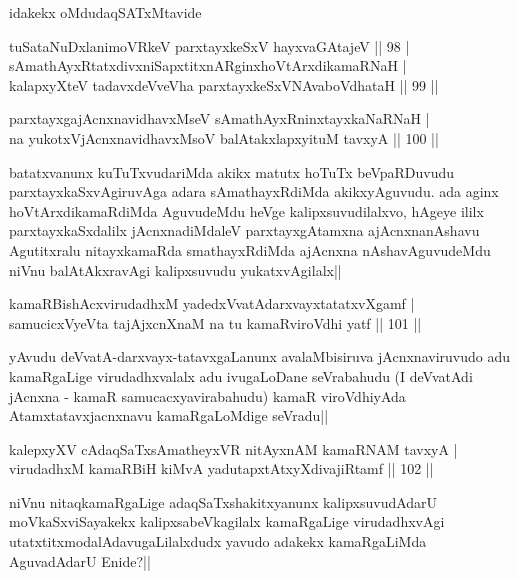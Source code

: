 \begin{artha}
idakekx oMdudaqSATxMtavide
\end{artha}

\begin{shl}
tuSataNuDxlanimoVRkeV parxtayxkeSxV hayxvaGAtajeV \hfill || 98 |\\
sAmathAyxRtatxdivxniSapxtitxnARginxhoVtArxdikamaRNaH |\\
kalapxyXteV tadavxdeVveVha parxtayxkeSxVNAvaboVdhataH \hfill || 99 ||
\end{shl}

\begin{shl}
parxtayxgajAcnxnavidhavxMseV sAmathAyxRninxtayxkaNaRNaH |\\
na yukotxV\s jAcnxnavidhavxMsoV balAtakxlapxyituM tavxyA \hfill || 100 ||
\end{shl}

\begin{artha}
batatxvanunx kuTuTxvudariMda akikx matutx hoTuTx beVpaRDuvudu parxtayxkaSxvAgiruvAga adara sAmathayxRdiMda akikxyAguvudu. ada aginx hoVtArxdikamaRdiMda AguvudeMdu heVge kalipxsuvudilalxvo, hAgeye ililx parxtayxkaSxdalilx jAcnxnadiMdaleV parxtayxgAtamxna ajAcnxnanAshavu Agutitxralu nitayxkamaRda smathayxRdiMda ajAcnxna nAshavAguvudeMdu niVnu balAtAkxravAgi kalipxsuvudu yukatxvAgilalx||
\end{artha}


\begin{shl}
kamaRBishAcxvirudadhxM yadedxVvatAdarxvayxtatatxvXgamf |\\
samucicxVyeVta tajAjxcnXnaM na tu kamaRviroVdhi yatf \hfill || 101 ||
\end{shl}

\begin{artha}
yAvudu deVvatA-darxvayx-tatavxgaLanunx avalaMbisiruva jAcnxnaviruvudo adu kamaRgaLige virudadhxvalalx adu ivugaLoDane seVrabahudu (I deVvatAdi jAcnxna - kamaR samucacxyavirabahudu) kamaR viroVdhiyAda Atamxtatavxjacnxnavu kamaRgaLoMdige seVradu||
\end{artha}

\begin{shl}
kalepxyXV cAdaqSaTxsAmatheyxVR nitAyxnAM kamaRNAM tavxyA |\\
virudadhxM kamaRBiH kiMvA yadutapxtAtxyXdivajiRtamf \hfill || 102 ||
\end{shl}

\begin{artha}
niVnu nitaqkamaRgaLige adaqSaTxshakitxyanunx kalipxsuvudAdarU moVkaSxviSayakekx kalipxsabeVkagilalx kamaRgaLige virudadhxvAgi utatxtitxmodalAdavugaLilalxdudx yavudo adakekx kamaRgaLiMda AguvadAdarU Enide?||
\end{artha}

